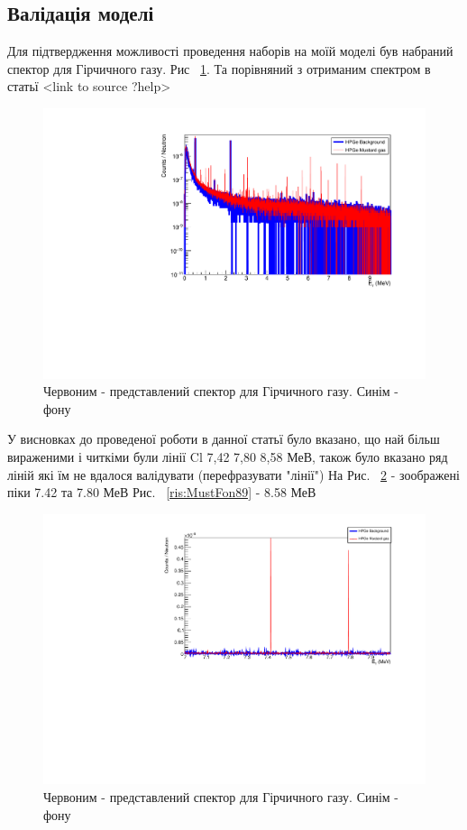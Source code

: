 \documentclass[a4paper, 14pt]{article}
\numberwithin{equation}{section}
\numberwithin{table}{section}
\begin{document}
\subsection{Валідація моделі}

	Для підтвердження можливості проведення наборів на моїй моделі був набраний спектор для Гірчичного газу. Рис ~\ref{ris:MustBackAllLogSm}. Та порівняний з отриманим спектром в статьї <link to source ?help> 	
	\begin{figure}[hbt!]
		\centering \includegraphics[width=1\textwidth]{res/smMustFonAll.pdf}
		\caption{Червоним - представлений спектор для Гірчичного газу. Синім - фону} 
		\label{ris:MustBackAllLogSm}	
	\end{figure} 
	У висновках до проведеної роботи в данної статьї було вказано, що най більш вираженими і читкіми були лінії Cl 7,42 7,80 8,58 МеВ, також було вказано ряд ліній які їм не вдалося валідувати (перефразувати "лінії") 
	На Рис. ~\ref{ris:MustFon78} - зоображені піки 7.42 та 7.80 МеВ
	Рис.  ~\ref{ris:MustFon89} - 8.58 МеВ	
	\begin{figure}[hbt!]
		\centering \includegraphics[width=1\textwidth]{res/mustFon78.pdf}
		\caption{Червоним - представлений спектор для Гірчичного газу. Синім - фону} 
		\label{ris:MustFon78}	
	\end{figure} 	
\end{document}
